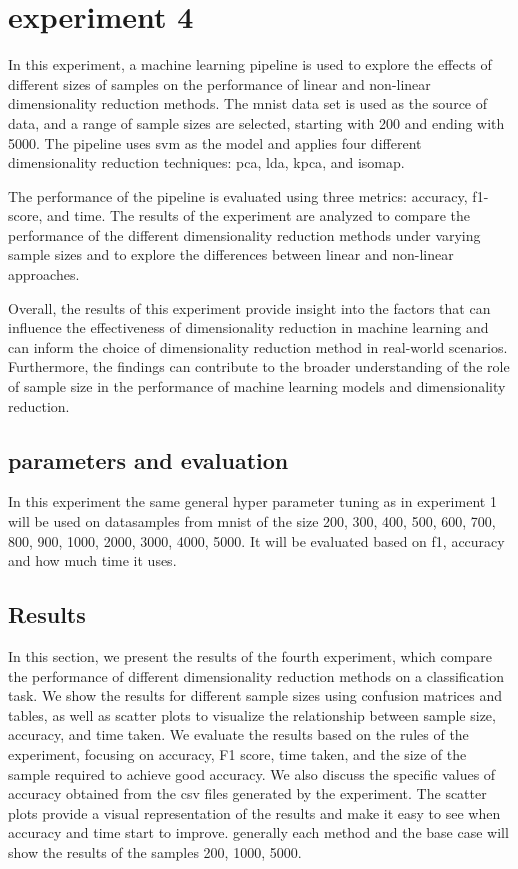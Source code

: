 \section{experiment 4}\label{sec:experiment-4}

In this experiment, a machine learning pipeline is used to explore the effects of different sizes of samples on the performance of linear and non-linear dimensionality reduction methods. The \gls{mnist} data set is used as the source of data, and a range of sample sizes are selected, starting with 200 and ending with 5000. The pipeline uses \gls{svm} as the model and applies four different dimensionality reduction techniques: \gls{pca}, \gls{lda}, \gls{kpca}, and \gls{isomap}.

The performance of the pipeline is evaluated using three metrics: accuracy, f1-score, and time. The results of the experiment are analyzed to compare the performance of the different dimensionality reduction methods under varying sample sizes and to explore the differences between linear and non-linear approaches.

Overall, the results of this experiment provide insight into the factors that can influence the effectiveness of dimensionality reduction in machine learning and can inform the choice of dimensionality reduction method in real-world scenarios. Furthermore, the findings can contribute to the broader understanding of the role of sample size in the performance of machine learning models and dimensionality reduction.

\subsection{parameters and evaluation}
In this experiment the same general hyper parameter tuning as in experiment 1 will be used on datasamples from \gls{mnist} of the size 200, 300, 400, 500, 600, 700, 800, 900, 1000, 2000, 3000, 4000, 5000. It will be evaluated based on f1, accuracy and how much time it uses.




\subsection{Results}\label{subsec:experiment_4_results}
In this section, we present the results of the fourth experiment, which compare the performance of different dimensionality reduction methods on a classification task. We show the results for different sample sizes using confusion matrices and tables, as well as scatter plots to visualize the relationship between sample size, accuracy, and time taken. We evaluate the results based on the rules of the experiment, focusing on accuracy, F1 score, time taken, and the size of the sample required to achieve good accuracy. We also discuss the specific values of accuracy obtained from the csv files generated by the experiment. The scatter plots provide a visual representation of the results and make it easy to see when accuracy and time start to improve. generally each method and the base case will show the results of the samples 200, 1000, 5000.

